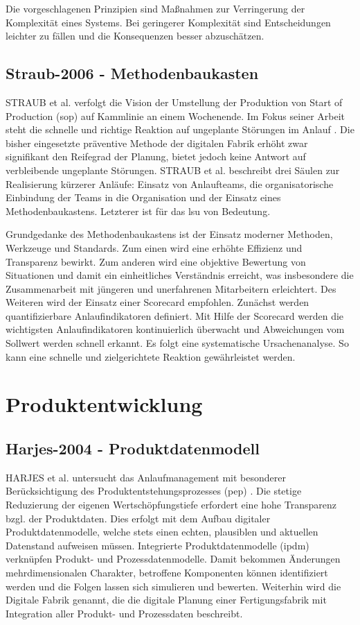 Die vorgeschlagenen Prinzipien sind Maßnahmen zur Verringerung der Komplexität eines Systems. Bei geringerer Komplexität sind Entscheidungen leichter zu fällen und die Konsequenzen besser abzuschätzen. 

\subsection*{Straub-2006 - Methodenbaukasten}

STRAUB et al. verfolgt die Vision der Umstellung der Produktion von Start of Production (\gls{sop}) 
auf Kammlinie an einem Wochenende. Im Fokus seiner Arbeit steht die schnelle und richtige Reaktion auf ungeplante Störungen im Anlauf \autocite{Straub2006}. Die bisher eingesetzte präventive Methode der digitalen Fabrik erhöht zwar signifikant den Reifegrad der Planung, bietet jedoch keine Antwort auf verbleibende ungeplante Störungen. STRAUB et al. beschreibt drei Säulen zur Realisierung kürzerer Anläufe: Einsatz von Anlaufteams, die organisatorische Einbindung der Teams in die Organisation und der Einsatz eines Methodenbaukastens. Letzterer ist für das \gls{lsu} von Bedeutung. 

Grundgedanke des Methodenbaukastens ist der Einsatz moderner Methoden, Werkzeuge und Standards.
Zum einen wird eine erhöhte Effizienz und Transparenz bewirkt. Zum anderen wird eine objektive Bewertung von Situationen und damit ein einheitliches Verständnis erreicht, was insbesondere die Zusammenarbeit mit jüngeren und unerfahrenen Mitarbeitern erleichtert. 
Des Weiteren wird der Einsatz einer Scorecard empfohlen. 
Zunächst werden quantifizierbare Anlaufindikatoren definiert. Mit Hilfe der Scorecard werden die wichtigsten Anlaufindikatoren kontinuierlich überwacht und Abweichungen vom Sollwert werden schnell erkannt. Es folgt eine systematische Ursachenanalyse. So kann eine schnelle und zielgerichtete Reaktion gewährleistet werden. 


\section{Produktentwicklung}
\subsection*{Harjes-2004 - Produktdatenmodell}
HARJES et al. untersucht das Anlaufmanagement mit besonderer Berücksichtigung des Produktentstehungsprozesses (\gls{pep}) \autocite{Harjes2004}. 
Die stetige Reduzierung der eigenen Wertschöpfungstiefe erfordert eine hohe Transparenz bzgl. der Produktdaten. Dies erfolgt mit dem Aufbau digitaler Produktdatenmodelle, welche stets einen echten, plausiblen und aktuellen Datenstand aufweisen müssen. 
Integrierte Produktdatenmodelle (\gls{ipdm})
verknüpfen Produkt- und Prozessdatenmodelle. Damit bekommen Änderungen mehrdimensionalen Charakter, betroffene Komponenten können identifiziert werden und die Folgen lassen sich simulieren und bewerten. 
Weiterhin wird die Digitale Fabrik genannt, die die digitale Planung einer Fertigungsfabrik mit Integration aller Produkt- und Prozessdaten beschreibt. 

